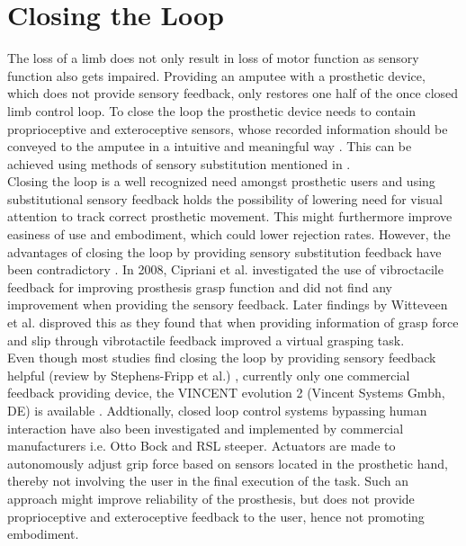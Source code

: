 \section{Closing the Loop}

The loss of a limb does not only result in loss of motor function as sensory function also gets impaired. Providing an amputee with a prosthetic device, which does not provide sensory feedback, only restores one half of the once closed limb control loop. To close the loop the prosthetic device needs to contain proprioceptive and exteroceptive sensors, whose recorded information should be conveyed to the amputee in a intuitive and meaningful way \cite{Markovic2018}. This can be achieved using methods of sensory substitution mentioned in . \\
Closing the loop is a well recognized need amongst prosthetic users and using substitutional sensory feedback holds the possibility of lowering need for visual attention to track correct prosthetic movement. This might furthermore improve easiness of use and embodiment, which could lower rejection rates. \cite{Strbac2016} However, the advantages of closing the loop by providing sensory substitution feedback have been contradictory \cite{Jorgovanovic2014}. In 2008, Cipriani et al. \cite{Cipriani2008} investigated the use of vibroctacile feedback for improving prosthesis grasp function and did not find any improvement when providing the sensory feedback. Later findings by Witteveen et al. \cite{Witteveen2012} disproved this as they found that when providing information of grasp force and slip through vibrotactile feedback improved a virtual grasping task. \\
Even though most studies find closing the loop by providing sensory feedback helpful (review by Stephens-Fripp et al.) \cite{Stephens-Fripp2018}, currently only one commercial feedback providing device, the VINCENT evolution 2 (Vincent Systems Gmbh, DE) is available \cite{Systems2005}.  
Addtionally, closed loop control systems bypassing human interaction have also been investigated and implemented by commercial manufacturers i.e. Otto Bock and RSL steeper. Actuators are made to autonomously adjust grip force based on sensors located in the prosthetic hand, thereby not involving the user in the final execution of the task. \cite{Xu2016} Such an approach might improve reliability of the prosthesis, but does not provide proprioceptive and exteroceptive feedback to the user, hence not promoting embodiment.  




